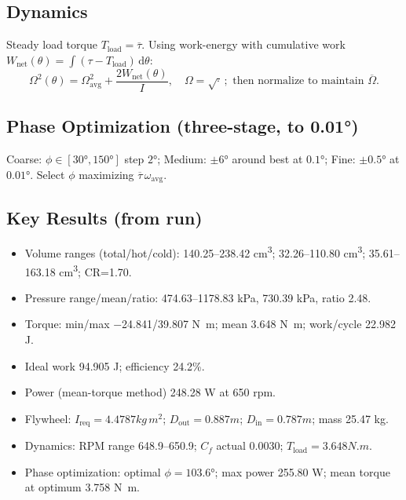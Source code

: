 \documentclass[11pt]{article}
\begin{document}
\subsection*{Dynamics}
Steady load torque $T_{\text{load}}=\overline{\tau}$. Using work-energy with cumulative work $W_{\text{net}}(\theta)=\int (\tau-T_{\text{load}})\,\mathrm{d}\theta$:
\[ \Omega^2(\theta)=\Omega_{\text{avg}}^2 + \frac{2W_{\text{net}}(\theta)}{I},\quad \Omega=\sqrt{\cdot}\,;\text{ then normalize to maintain }\overline{\Omega}. \]

\subsection*{Phase Optimization (three-stage, to 0.01°)}
Coarse: $\phi\in[\ang{30},\ang{150}]$ step $\ang{2}$; Medium: $\pm\ang{6}$ around best at $\ang{0.1}$; Fine: $\pm\ang{0.5}$ at $\ang{0.01}$. Select $\phi$ maximizing $\overline{\tau}\,\omega_{\text{avg}}$.

\subsection*{Key Results (from run)}
\begin{itemize}
  \item Volume ranges (total/hot/cold): \num{140.25}–\num{238.42} cm\textsuperscript{3}; \num{32.26}–\num{110.80} cm\textsuperscript{3}; \num{35.61}–\num{163.18} cm\textsuperscript{3}; CR=\num{1.70}.
  \item Pressure range/mean/ratio: \num{474.63}–\num{1178.83} \si{kPa}, \num{730.39} \si{kPa}, ratio \num{2.48}.
  \item Torque: min/max \num{-24.841}/\num{39.807} \si{N.m}; mean \num{3.648} \si{N.m}; work/cycle \num{22.982} \si{J}.
  \item Ideal work \num{94.905} \si{J}; efficiency \num{24.2}\%.
  \item Power (mean-torque method) \num{248.28} \si{W} at \num{650} \si{rpm}.
  \item Flywheel: $I_{\text{req}}=\num{4.4787} \si{kg\,m^2}$; $D_{\text{out}}=\num{0.887} \si{m}$; $D_{\text{in}}=\num{0.787} \si{m}$; mass \num{25.47} \si{kg}.
  \item Dynamics: RPM range \num{648.9}–\num{650.9}; $C_f$ actual \num{0.0030}; $T_{\text{load}}=\num{3.648} \si{N.m}$.
  \item Phase optimization: optimal $\phi=\ang{103.6}$; max power \num{255.80} \si{W}; mean torque at optimum \num{3.758} \si{N.m}.
\end{itemize}
\end{document}
